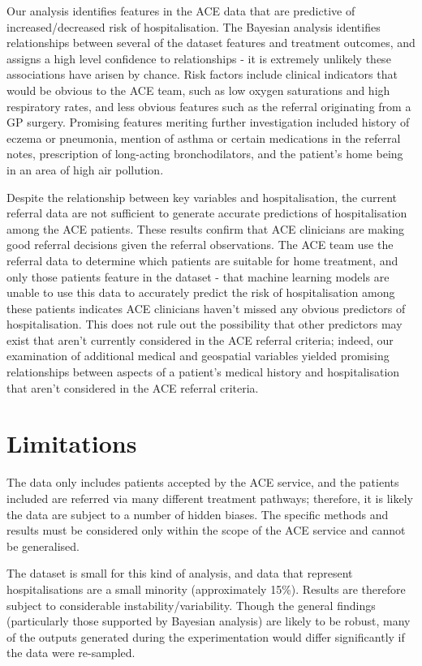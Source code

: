 Our analysis identifies features in the ACE data that are predictive of increased/decreased risk of hospitalisation. The Bayesian analysis identifies relationships between several of the dataset features and treatment outcomes, and assigns a high level confidence to relationships - it is extremely unlikely these associations have arisen by chance. Risk factors include clinical indicators that would be obvious to the ACE team, such as low oxygen saturations and high respiratory rates, and less obvious features such as the referral originating from a GP surgery. Promising features meriting further investigation included history of eczema or pneumonia, mention of asthma or certain medications in the referral notes, prescription of long-acting bronchodilators, and the patient's home being in an area of high air pollution.

Despite the relationship between key variables and hospitalisation, the current referral data are not sufficient to generate accurate predictions of hospitalisation among the ACE patients. These results confirm that ACE clinicians are making good referral decisions given the referral observations. The ACE team use the referral data to determine which patients are suitable for home treatment, and only those patients feature in the dataset - that machine learning models are unable to use this data to accurately predict the risk of hospitalisation among these patients indicates ACE clinicians haven't missed any obvious predictors of hospitalisation. This does not rule out the possibility that other predictors may exist that aren't currently considered in the ACE referral criteria; indeed, our examination of additional medical and geospatial variables yielded promising relationships between aspects of a patient's medical history and hospitalisation that aren't considered in the ACE referral criteria.

\section*{Limitations}\label{sec:limitations}

The data only includes patients accepted by the ACE service, and the patients included are referred via many different treatment pathways;
therefore, it is likely the data are subject to a number of hidden biases.
The specific methods and results must be considered only within the scope of the ACE service and cannot be generalised.

The dataset is small for this kind of analysis, and data that represent hospitalisations are a small minority (approximately 15\%).
Results are therefore subject to considerable instability/variability.
Though the general findings (particularly those supported by Bayesian analysis) are likely to be robust, many of the outputs generated during the experimentation would differ significantly if the data were re-sampled.

